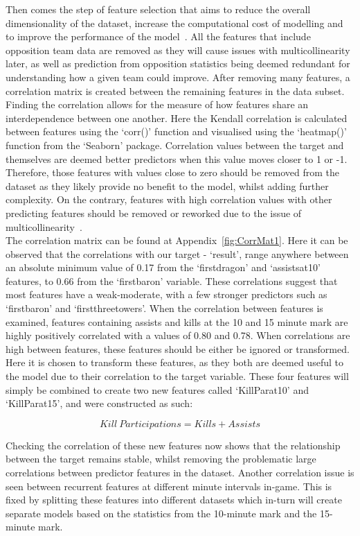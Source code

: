 Then comes the step of feature selection that aims to reduce the overall dimensionality of the dataset, increase the computational cost of modelling and to improve the performance of the model~\citep{brownlee2019choose}.
All the features that include opposition team data are removed as they will cause issues with multicollinearity later, as well as prediction from opposition statistics being deemed redundant for understanding how a given team could improve.
After removing many features, a correlation matrix is created between the remaining features in the data subset.
Finding the correlation allows for the measure of how features share an interdependence between one another.
Here the Kendall correlation is calculated between features using the `corr()' function and visualised using the `heatmap()' function from the `Seaborn' package.
Correlation values between the target and themselves are deemed better predictors when this value moves closer to 1 or -1.
Therefore, those features with values close to zero should be removed from the dataset as they likely provide no benefit to the model, whilst adding further complexity.
On the contrary, features with high correlation values with other predicting features should be removed or reworked due to the issue of multicollinearity~\citep{alin2010multicollinearity}. \\

The correlation matrix can be found at Appendix~\ref{fig:CorrMat1}.
Here it can be observed that the correlations with our target - `result', range anywhere between an absolute minimum value of 0.17 from the `firstdragon' and `assistsat10' features, to 0.66 from the `firstbaron' variable.
These correlations suggest that most features have a weak-moderate, with a few stronger predictors such as `firstbaron' and `firstthreetowers'.
When the correlation between features is examined, features containing assists and kills at the 10 and 15 minute mark are highly positively correlated with a values of 0.80 and 0.78.
When correlations are high between features, these features should be either be ignored or transformed.
Here it is chosen to transform these features, as they both are deemed useful to the model due to their correlation to the target variable.
These four features will simply be combined to create two new features called `KillParat10' and `KillParat15', and were constructed as such:

\[ Kill \: Participations = Kills + Assists \]

Checking the correlation of these new features now shows that the relationship between the target remains stable, whilst removing the problematic large correlations between predictor features in the dataset.
Another correlation issue is seen between recurrent features at different minute intervals in-game.
This is fixed by splitting these features into different datasets which in-turn will create separate models based on the statistics from the 10-minute mark and the 15-minute mark. \\

